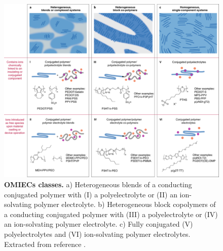 \begin{figure}[!htb]
  \centering
  \includegraphics[width=\textwidth]{Images/pdf/OMIEC_types.pdf}
  \caption[Material classes of OMIECs]{\textbf{OMIECs classes.} a) Heterogeneous blends of a conducting conjugated polymer with (I) %
  a polyelectrolyte or (II) an ion-solvating polymer electrolyte. %
  b) Heterogeneous block copolymers of a conducting conjugated polymer with (III) %
  a polyelectrolyte or (IV) an ion-solvating polymer electrolyte. %
  c) Fully conjugated (V) %
  polyelectrolytes and (VI) ion-solvating polymer electrolytes. %
  Extracted from reference \cite{paulsenOrganicMixedIonic2020}.}
  \label{fig:omiectypes}
\end{figure}

